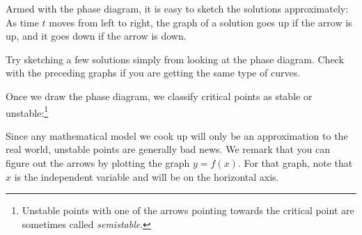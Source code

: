 \begin{center}
\end{center}

\pagebreak[0]
Armed with the phase diagram,
it is easy to sketch the solutions approximately:  As time $t$
moves from left to right,
the graph of a solution
goes up if the arrow is up, and it goes down if the arrow is down.

\begin{exercise}
Try sketching a few solutions simply from looking at the phase diagram.
Check with the preceding graphs if
you are getting the same type of curves.
\end{exercise}

\pagebreak[0]
Once we draw the phase diagram, we classify critical points
as stable or unstable:\footnote{Unstable
points with one of the
arrows pointing towards the critical point are sometimes called
\emph{semistable}.}
\begin{center}
\end{center}
Since any mathematical model we cook up will only be an approximation
to the real world, unstable points are generally bad news.
We remark that you can figure out the arrows by plotting the graph $y=f(x)$.
For that graph, note that $x$ is the independent variable and will
be on the horizontal axis.

\medskip

